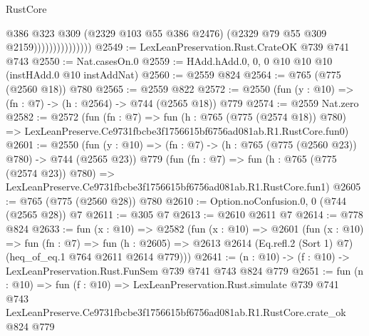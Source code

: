 \begin{lexlean}{RustCore}
\begin{coremodule}
                                @386
                                @323
                                @309
                                (@2329 @103 @55 @386 @2476)
                                (@2329 @79 @55 @309 @2159)))))))))))))))
@2549 := LexLeanPreservation.Rust.CrateOK @739 @741 @743
@2550 := Nat.casesOn.{0}
@2559 := HAdd.hAdd.{0, 0, 0} @10 @10 @10 (instHAdd.{0} @10 instAddNat)
@2560 := @2559 @824
@2564 := @765 (@775 (@2560 @18)) @780
@2565 := @2559 @822
@2572 := @2550 (fun (y : @10) => (fn : @7) -> (h : @2564) -> @744 (@2565 @18)) @779
@2574 := @2559 Nat.zero
@2582 := @2572
    (fun (fn : @7) =>
    fun (h : @765 (@775 (@2574 @18)) @780) =>
    LexLeanPreserve.Ce9731fbcbe3f1756615bf6756ad081ab.R1.RustCore.fun0)
@2601 := @2550
    (fun (y : @10) => (fn : @7) -> (h : @765 (@775 (@2560 @23)) @780) -> @744 (@2565 @23))
    @779
    (fun (fn : @7) =>
    fun (h : @765 (@775 (@2574 @23)) @780) =>
    LexLeanPreserve.Ce9731fbcbe3f1756615bf6756ad081ab.R1.RustCore.fun1)
@2605 := @765 (@775 (@2560 @28)) @780
@2610 := Option.noConfusion.{0, 0} (@744 (@2565 @28)) @7
@2611 := @305 @7
@2613 := @2610 @2611 @7
@2614 := @778 @824
@2633 := fun (x : @10) =>
  @2582
    (fun (x : @10) =>
    @2601
      (fun (x : @10) =>
      fun (fn : @7) =>
      fun (h : @2605) =>
      @2613 @2614 (Eq.refl.{2} (Sort 1) @7) (heq_of_eq.{1} @764 @2611 @2614 @779)))
@2641 := (n : @10) -> (f : @10) -> LexLeanPreservation.Rust.FunSem @739 @741 @743 @824 @779
@2651 := fun (n : @10) =>
  fun (f : @10) =>
  LexLeanPreservation.Rust.simulate
    @739
    @741
    @743
    LexLeanPreserve.Ce9731fbcbe3f1756615bf6756ad081ab.R1.RustCore.crate_ok
    @824
    @779
\end{coremodule}
\end{lexlean}
